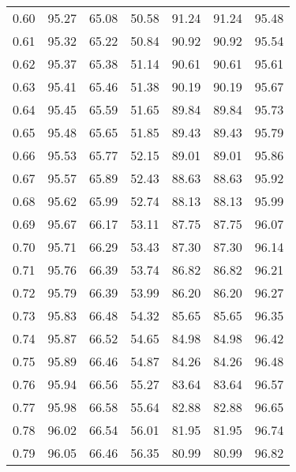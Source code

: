\begin{tabular}{|c|c|c|c|c|c|c|}
      0.60 &     95.27 &     65.08 &      50.58 &   91.24 &      91.24 &         95.48 \\
      0.61 &     95.32 &     65.22 &      50.84 &   90.92 &      90.92 &         95.54 \\
      0.62 &     95.37 &     65.38 &      51.14 &   90.61 &      90.61 &         95.61 \\
      0.63 &     95.41 &     65.46 &      51.38 &   90.19 &      90.19 &         95.67 \\
      0.64 &     95.45 &     65.59 &      51.65 &   89.84 &      89.84 &         95.73 \\
      0.65 &     95.48 &     65.65 &      51.85 &   89.43 &      89.43 &         95.79 \\
      0.66 &     95.53 &     65.77 &      52.15 &   89.01 &      89.01 &         95.86 \\
      0.67 &     95.57 &     65.89 &      52.43 &   88.63 &      88.63 &         95.92 \\
      0.68 &     95.62 &     65.99 &      52.74 &   88.13 &      88.13 &         95.99 \\
      0.69 &     95.67 &     66.17 &      53.11 &   87.75 &      87.75 &         96.07 \\
      0.70 &     95.71 &     66.29 &      53.43 &   87.30 &      87.30 &         96.14 \\
      0.71 &     95.76 &     66.39 &      53.74 &   86.82 &      86.82 &         96.21 \\
      0.72 &     95.79 &     66.39 &      53.99 &   86.20 &      86.20 &         96.27 \\
      0.73 &     95.83 &     66.48 &      54.32 &   85.65 &      85.65 &         96.35 \\
      0.74 &     95.87 &     66.52 &      54.65 &   84.98 &      84.98 &         96.42 \\
      0.75 &     95.89 &     66.46 &      54.87 &   84.26 &      84.26 &         96.48 \\
      0.76 &     95.94 &     66.56 &      55.27 &   83.64 &      83.64 &         96.57 \\
      0.77 &     95.98 &     66.58 &      55.64 &   82.88 &      82.88 &         96.65 \\
      0.78 &     96.02 &     66.54 &      56.01 &   81.95 &      81.95 &         96.74 \\
      0.79 &     96.05 &     66.46 &      56.35 &   80.99 &      80.99 &         96.82 \\

\end{tabular}
